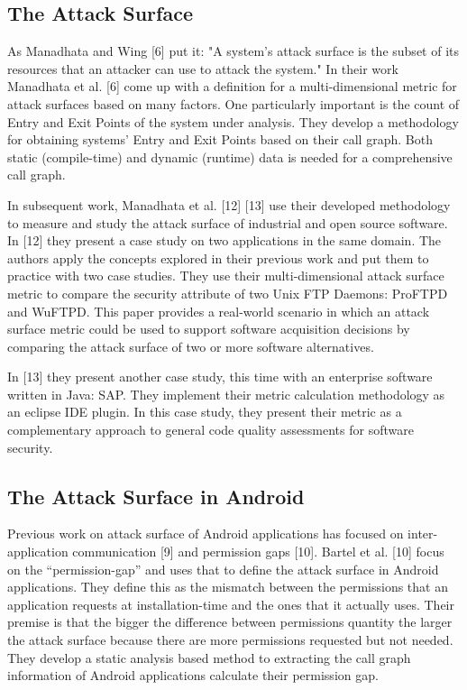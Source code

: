 \documentclass[conference]{IEEEtran}
\begin{document}
\subsection{The Attack Surface}

As Manadhata and Wing [6] put it: "A system's attack surface is the subset of its resources that an attacker can use to attack the system." In their work Manadhata et al. [6] come up with a definition for a multi-dimensional metric for attack surfaces based on many factors. One particularly important is the count of Entry and Exit Points of the system under analysis. They develop a methodology for obtaining systems' Entry and Exit Points based on their call graph. Both static (compile-time) and dynamic (runtime) data is needed for a comprehensive call graph.

In subsequent work, Manadhata et al. [12] [13] use their developed methodology to measure and study the attack surface of industrial and open source software. In [12] they present a case study on two applications in the same domain. The authors apply the concepts explored in their previous work and put them to practice with two case studies. They use their multi-dimensional attack surface metric to compare the security attribute of two Unix FTP Daemons: ProFTPD and WuFTPD. This paper provides a real-world scenario in which an attack surface metric could be used to support software acquisition decisions by comparing the attack surface of two or more software alternatives.

In [13] they present another case study, this time with an enterprise software written in Java: SAP. They implement their metric calculation methodology as an eclipse IDE plugin. In this case study, they present their metric as a complementary approach to general code quality assessments for software security.

\subsection{The Attack Surface in Android}

Previous work on attack surface of Android applications has focused on inter-application communication [9] and permission gaps [10]. Bartel et al. [10] focus on the “permission-gap” and uses that to define the attack surface in Android applications. They define this as the mismatch between the permissions that an application requests at installation-time and the ones that it actually uses. Their premise is that the bigger the difference between permissions quantity the larger the attack surface because there are more permissions requested but not needed. They develop a static analysis based method to extracting the call graph information of Android applications calculate their permission gap.
\end{document}
